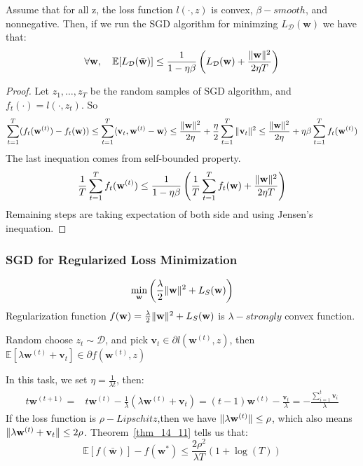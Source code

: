  \begin{thm}
	 Assume that for all z, the loss function $ l(\cdot, z) $ is convex, $ \beta-smooth $, and nonnegative.
	 Then, if we run the SGD algorithm for minimzing $ L_{\mathcal{D}}(\mathbf{w}) $ we have that:
	 \begin{equation}
	 	\forall \mathbf{w},\quad 
		\mathbb{E} [L_{\mathcal{D}}(\bar{\mathbf{w}})]
		\le \frac{1}{1-\eta\beta}
		\left( 
			L_{\mathcal{D}}(\mathbf{w}) + \frac{\Arrowvert \mathbf{w} \Arrowvert^2}{2\eta T}	
		\right)
	 \end{equation}
	 \begin{proof}
	 	Let $ z_1, \dots, z_T $ be the random samples of SGD algorithm,
		and $ f_t(\cdot) = l(\cdot, z_t) $. So
		\[ 
			\sum\limits^T_{t=1} (f_t(\mathbf{w}^{(t)}) - f_t(\mathbf{w}))
			\le \sum\limits^T_{t=1} \langle \mathbf{v}_t, \mathbf{w}^{(t)} - \mathbf{w} \rangle
			\le \frac{\Arrowvert \mathbf{w} \Arrowvert^2}{2\eta} + 
			\frac{\eta}{2} \sum\limits^T_{t=1} \Arrowvert \mathbf{v}_t \Arrowvert^2 
			\le \frac{\Arrowvert \mathbf{w} \Arrowvert^2}{2\eta} + 
			\eta \beta \sum\limits^{T}_{t=1}f_t(\mathbf{w}^{(t)})
		\]
		The last inequation comes from self-bounded property.
		\[ 
			\frac{1}{T}\sum\limits^T_{t=1}f_t(\mathbf{w}^{(t)})
			\le \frac{1}{1-\eta\beta}
			\left( 
				\frac{1}{T}	\sum\limits^T_{t=1}f_t(\mathbf{w}) + 
			\frac{\Arrowvert \mathbf{w} \Arrowvert^2}{2\eta T}	
			\right)
		\]
		Remaining steps are taking expectation of both side and using Jensen's inequation.
	 \end{proof}
 \end{thm}

 \subsubsection{SGD for Regularized Loss Minimization}

\[ 
	\underset{\mathbf{w}}{\min} \left( 
		\frac{\lambda}{2} \Arrowvert \mathbf{w} \Arrowvert^2 + L_S(\mathbf{w})
	\right)
\]	
Regularization function $ f(\mathbf{w}) = \frac{\lambda}{2} \Arrowvert \mathbf{w} \Arrowvert^2 + L_S(\mathbf{w}) $ 
is $ \lambda-strongly $ convex function.
\begin{lem}
	Random choose $ z_t \sim \mathcal{D} $, and pick $ \mathbf{v}_t \in \partial l(\mathbf{w}^{(t)},z)$,
	then $ \mathbb{E} [\lambda \mathbf{w}^{(t)} + \mathbf{v}_t] \in \partial f(\mathbf{w}^{(t)}, z)$
\end{lem}
In this task, we set $ \eta = \frac{1}{\lambda t} $, then:
\begin{align*}
	t \mathbf{w}^{(t+1)} =& t \mathbf{w}^{(t)} - \frac{1}{\lambda}(\lambda \mathbf{w}^{(t)} + \mathbf{v}_t)
	= (t-1)\mathbf{w}^{(t)} - \frac{\mathbf{v}_t}{\lambda}
	= -\frac{\sum^t_{i=1}\mathbf{v}_i}{\lambda}
\end{align*}
If the loss function is $ \rho-Lipschitz $,then we have 
$ \Arrowvert \lambda \mathbf{w}^{(t)} \Arrowvert \le \rho $,
which also means $ \Arrowvert \lambda \mathbf{w}^{(t)} + \mathbf{v}_t \Arrowvert \le 2\rho $.
Theorem~\ref{thm_14_11} tells us that:
\begin{equation}
	\mathbb{E}[f(\bar{\mathbf{w}})] - f(\mathbf{w}^*) \le 
	\frac{2\rho^2}{\lambda T}(1+\log(T))
\end{equation}
